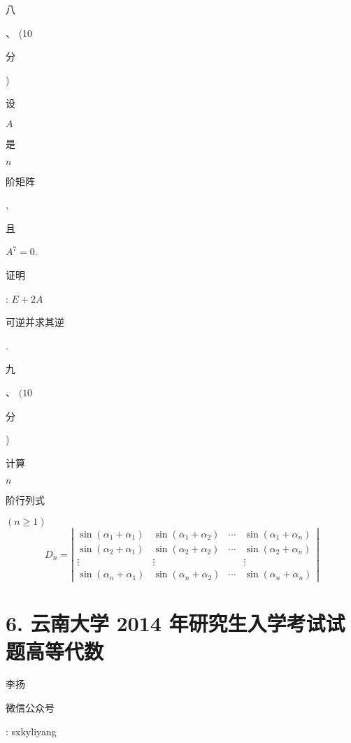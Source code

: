\documentclass[10pt]{article}
\begin{document}
\begin{CJK}{UTF8}{mj}八\end{CJK}、 (10 \begin{CJK}{UTF8}{mj}分\end{CJK}) \begin{CJK}{UTF8}{mj}设\end{CJK} $A$ \begin{CJK}{UTF8}{mj}是\end{CJK} $n$ \begin{CJK}{UTF8}{mj}阶矩阵\end{CJK}, \begin{CJK}{UTF8}{mj}且\end{CJK} $A^{7}=0$. \begin{CJK}{UTF8}{mj}证明\end{CJK}: $E+2 A$ \begin{CJK}{UTF8}{mj}可逆并求其逆\end{CJK}. \begin{CJK}{UTF8}{mj}九\end{CJK}、 $(10$ \begin{CJK}{UTF8}{mj}分\end{CJK}) \begin{CJK}{UTF8}{mj}计算\end{CJK} $n$ \begin{CJK}{UTF8}{mj}阶行列式\end{CJK} $(n \geqslant 1)$
$$
D_{n}=\left|\begin{array}{cccc}
\sin \left(\alpha_{1}+\alpha_{1}\right) & \sin \left(\alpha_{1}+\alpha_{2}\right) & \cdots & \sin \left(\alpha_{1}+\alpha_{n}\right) \\
\sin \left(\alpha_{2}+\alpha_{1}\right) & \sin \left(\alpha_{2}+\alpha_{2}\right) & \cdots & \sin \left(\alpha_{2}+\alpha_{n}\right) \\
\vdots & \vdots & & \vdots \\
\sin \left(\alpha_{n}+\alpha_{1}\right) & \sin \left(\alpha_{n}+\alpha_{2}\right) & \cdots & \sin \left(\alpha_{n}+\alpha_{n}\right)
\end{array}\right|
$$

\section{6. 云南大学 2014 年研究生入学考试试题高等代数}
\begin{CJK}{UTF8}{mj}李扬\end{CJK}

\begin{CJK}{UTF8}{mj}微信公众号\end{CJK}: sxkyliyang
\end{document}
